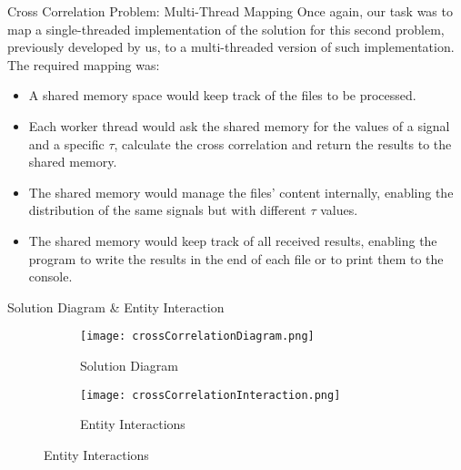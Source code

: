 \documentclass{beamer}
\begin{document}


\begin{frame}{Cross Correlation Problem: Multi-Thread Mapping}
	Once again, our task was to map a single-threaded implementation of the solution for this second problem, previously developed by us, to a multi-threaded
	version of such implementation.
	The required mapping was:
	\begin{itemize}
		\item A shared memory space would keep track of the files to be processed.
		\item Each worker thread would ask the shared memory for the values of a signal and a specific $\tau$, calculate the cross correlation and return the results to the shared memory.
		\item The shared memory would manage the files' content internally, enabling the distribution of the same signals but with different $\tau$ values.
		\item The shared memory would keep track of all received results, enabling the program to write the results in the end of each file or to print them to the console.
	\end{itemize}
\end{frame}


\begin{frame}{Solution Diagram \& Entity Interaction}
	\begin{figure}
		\begin{subfigure}{.49\textwidth}
			\hspace*{-.3in}
			\texttt{[image: crossCorrelationDiagram.png]}
			\caption{Solution Diagram}
			\label{crossDiagram}
		\end{subfigure}
		\begin{subfigure}{.49\textwidth}
			\texttt{[image: crossCorrelationInteraction.png]}
			\caption{Entity Interactions}
			\label{crossInteraction}
		\end{subfigure}
	\end{figure}
\end{frame}
\end{document}
